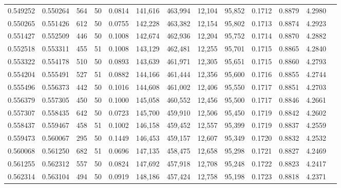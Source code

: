 \begin{tabular}{rrrrrrrrrrrrr}
0.549252 & 0.550264 &   564 &  50 &                                     0.0814 & 141,616 & 463,994 &  12,104 &  95,852 & 0.1712 & 0.8879 & 4.2980 \\
0.550265 & 0.551426 &   612 &  50 &                                     0.0755 & 142,228 & 463,382 &  12,154 &  95,802 & 0.1713 & 0.8874 & 4.2923 \\
0.551427 & 0.552509 &   446 &  50 &                                     0.1008 & 142,674 & 462,936 &  12,204 &  95,752 & 0.1714 & 0.8870 & 4.2882 \\
0.552518 & 0.553311 &   455 &  51 &                                     0.1008 & 143,129 & 462,481 &  12,255 &  95,701 & 0.1715 & 0.8865 & 4.2840 \\
0.553322 & 0.554178 &   510 &  50 &                                     0.0893 & 143,639 & 461,971 &  12,305 &  95,651 & 0.1715 & 0.8860 & 4.2793 \\
0.554204 & 0.555491 &   527 &  51 &                                     0.0882 & 144,166 & 461,444 &  12,356 &  95,600 & 0.1716 & 0.8855 & 4.2744 \\
0.555496 & 0.556373 &   442 &  50 &                                     0.1016 & 144,608 & 461,002 &  12,406 &  95,550 & 0.1717 & 0.8851 & 4.2703 \\
0.556379 & 0.557305 &   450 &  50 &                                     0.1000 & 145,058 & 460,552 &  12,456 &  95,500 & 0.1717 & 0.8846 & 4.2661 \\
0.557307 & 0.558435 &   642 &  50 &                                     0.0723 & 145,700 & 459,910 &  12,506 &  95,450 & 0.1719 & 0.8842 & 4.2602 \\
0.558437 & 0.559467 &   458 &  51 &                                     0.1002 & 146,158 & 459,452 &  12,557 &  95,399 & 0.1719 & 0.8837 & 4.2559 \\
0.559473 & 0.560067 &   295 &  50 &                                     0.1449 & 146,453 & 459,157 &  12,607 &  95,349 & 0.1720 & 0.8832 & 4.2532 \\
0.560068 & 0.561250 &   682 &  51 &                                     0.0696 & 147,135 & 458,475 &  12,658 &  95,298 & 0.1721 & 0.8827 & 4.2469 \\
0.561255 & 0.562312 &   557 &  50 &                                     0.0824 & 147,692 & 457,918 &  12,708 &  95,248 & 0.1722 & 0.8823 & 4.2417 \\
0.562314 & 0.563104 &   494 &  50 &                                     0.0919 & 148,186 & 457,424 &  12,758 &  95,198 & 0.1723 & 0.8818 & 4.2371 \\

\end{tabular}
